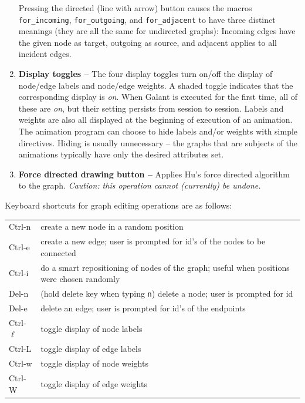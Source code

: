 \begin{enumerate}
Pressing the directed (line with arrow) button causes the macros
\texttt{for\_incoming}, \texttt{for\_outgoing}, and \texttt{for\_adjacent}
to have three distinct meanings (they are all the same for undirected graphs):
Incoming edges have the given node as target, outgoing as source, and adjacent applies to all incident edges.

\item
\textbf{Display toggles --}
The four display toggles turn on/off the display of node/edge labels and node/edge weights.
A shaded toggle indicates that the corresponding display is \emph{on}.
When Galant is executed for the first time, all of these are \emph{on},
but their setting persists from session to session.
Labels and weights are also all displayed at the beginning of execution of
an animation.
The animation program can choose to hide labels and/or weights with simple
directives.
Hiding is usually unnecessary -- the graphs that are subjects of the animations
typically have only the desired attributes set.

\item
\textbf{Force directed drawing button -- }
Applies Hu's force directed algorithm~\cite{2006-Mathematica-Hu} to the graph.
\emph{Caution: this operation cannot (currently) be undone.}

\end{enumerate}

Keyboard shortcuts for graph editing operations are as follows:

\begin{tabular}{l @{ -- } p{}}
\textsf{Ctrl-n} & create a new node in a random position \\
\textsf{Ctrl-e} & create a new edge; user is prompted for id's of the nodes to
be connected \\
\textsf{Ctrl-i} & do a smart repositioning of nodes of the graph;
useful when positions were chosen randomly \\
\textsf{Del-n} & (hold delete key when typing \texttt{n})
delete a node; user is prompted for id \\
\textsf{Del-e} & delete an edge; user is prompted for id's of the endpoints \\
\textsf{Ctrl-$\ell$} & toggle display of node labels \\
\textsf{Ctrl-L} & toggle display of edge labels \\
\textsf{Ctrl-w} & toggle display of node weights \\
\textsf{Ctrl-W} & toggle display of edge weights \\
\end{tabular}

